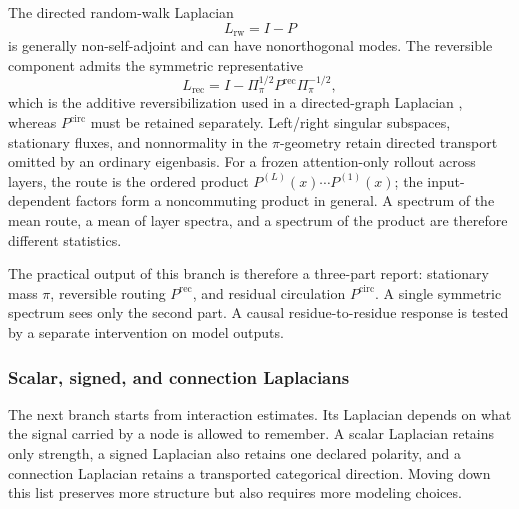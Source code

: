 \documentclass[10pt]{article}
\theoremstyle{definition}
\theoremstyle{remark}
\newcommand{\BookSubsection}[1]{\subsubsection{#1}}
\begin{document}
The directed random-walk Laplacian
\begin{equation}
L_{\mathrm{rw}}=I-P
\label{eq:directed-random-walk-laplacian}
\end{equation}
is generally non-self-adjoint and can have nonorthogonal modes.  The reversible component admits
the symmetric representative
\begin{equation}
L_{\mathrm{rec}}
=I-\Pi_\pi^{1/2}P^{\mathrm{rec}}\Pi_\pi^{-1/2},
\label{eq:reversible-laplacian}
\end{equation}
which is the additive reversibilization used in a directed-graph Laplacian \cite{chung2005},
whereas $P^{\mathrm{circ}}$ must be retained separately.  Left/right singular subspaces,
stationary fluxes, and nonnormality in the $\pi$-geometry retain directed transport omitted by an
ordinary eigenbasis.  For a frozen attention-only rollout across layers, the
route is the ordered product $P^{(L)}(x)\cdots P^{(1)}(x)$; the input-dependent factors form a
noncommuting product in general.  A spectrum of the
mean route, a mean of layer spectra, and a spectrum of the product are therefore different
statistics.

The practical output of this branch is therefore a three-part report: stationary mass $\pi$,
reversible routing $P^{\mathrm{rec}}$, and residual circulation $P^{\mathrm{circ}}$.  A single
symmetric spectrum sees only the second part.  A causal residue-to-residue response is tested by a
separate intervention on model outputs.

\BookSubsection{Scalar, signed, and connection Laplacians}

The next branch starts from interaction estimates.  Its Laplacian depends on what the signal
carried by a node is allowed to remember.  A scalar Laplacian retains only strength, a signed Laplacian also retains one declared
polarity, and a connection Laplacian retains a transported categorical direction.  Moving down this
list preserves more structure but also requires more modeling choices.
\end{document}
